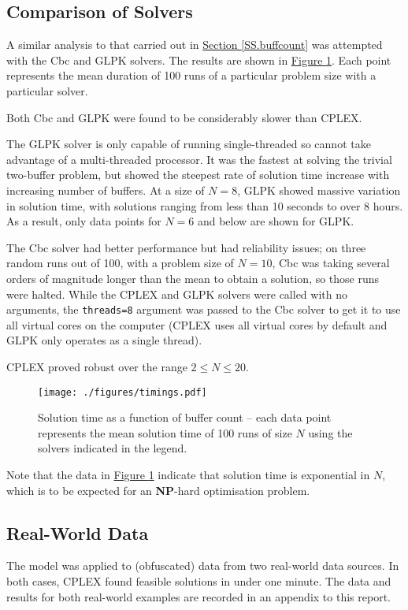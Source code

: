 \subsection{Comparison of Solvers}\label{SS.solvers}
A similar analysis to that carried out in
\hyperref[SS.buffcount]{Section \ref*{SS.buffcount}} was attempted with the
Cbc and GLPK solvers.
The results are shown in \hyperref[fig.timings]{Figure \ref*{fig.timings}}.
Each point represents the mean duration of 100 runs of a particular problem
size with a particular solver.

Both Cbc and GLPK were found to be considerably slower than CPLEX.

The GLPK solver is only capable of running single-threaded so cannot take
advantage of a multi-threaded processor.
It was the fastest at solving the trivial two-buffer problem, but showed the
steepest rate of solution time increase with increasing number of buffers.
At a size of $N=8$, GLPK showed massive variation in solution time, with
solutions ranging from less than 10 seconds to over 8 hours.  As a result,
only data points for $N=6$ and below are shown for GLPK.

The Cbc solver had better performance but had reliability issues; on three
random runs out of 100, with a problem size of $N=10$, Cbc was taking several
orders of magnitude longer than the mean to obtain a solution, so those runs
were halted.
While the CPLEX and GLPK solvers were called with no arguments, the
\texttt{threads=8} argument was passed to the Cbc solver to get it to use all
virtual cores on the computer (CPLEX uses all virtual cores by default and GLPK
only operates as a single thread).

CPLEX proved robust over the range $2 \le N \le 20$.

\begin{figure}
    \label{fig.timings}
    \centering
    \texttt{[image: ./figures/timings.pdf]}
    \caption[Solution time as a function of buffer count and solver]{Solution
        time as a function of buffer count -- each data point represents the
        mean solution time of 100 runs of size $N$ using the solvers indicated
        in the legend.}
\end{figure}

Note that the data in \hyperref[fig.timings]{Figure \ref*{fig.timings}}
indicate that solution time is exponential in $N$, which is to be expected for
an \textbf{NP}-hard optimisation problem.

\subsection{Real-World Data}\label{SS.realworld}
The model was applied to (obfuscated) data from two real-world data sources.
In both cases, CPLEX found feasible solutions in under one minute.
The data and results for both real-world examples are recorded in an appendix
to this report.

